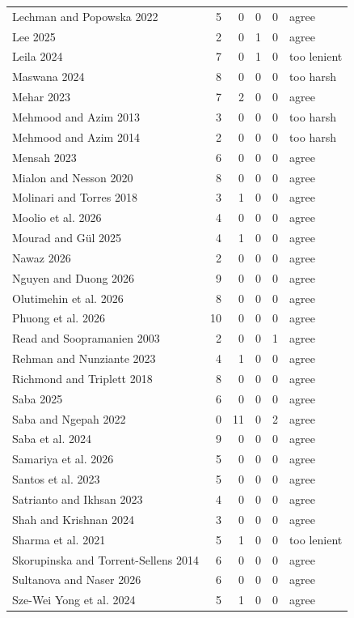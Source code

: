 {\begin{longtable}{@{}p{4cm} r r r r l@{}}
Lechman and Popowska 2022 & 5 & 0 & 0 & 0 & agree \\
Lee 2025 & 2 & 0 & 1 & 0 & agree \\
Leila 2024 & 7 & 0 & 1 & 0 & too lenient \\
Maswana 2024 & 8 & 0 & 0 & 0 & too harsh \\
Mehar 2023 & 7 & 2 & 0 & 0 & agree \\
Mehmood and Azim 2013 & 3 & 0 & 0 & 0 & too harsh \\
Mehmood and Azim 2014 & 2 & 0 & 0 & 0 & too harsh \\
Mensah 2023 & 6 & 0 & 0 & 0 & agree \\
Mialon and Nesson 2020 & 8 & 0 & 0 & 0 & agree \\
Molinari and Torres 2018 & 3 & 1 & 0 & 0 & agree \\
Moolio et al. 2026 & 4 & 0 & 0 & 0 & agree \\
Mourad and Gül 2025 & 4 & 1 & 0 & 0 & agree \\
Nawaz 2026 & 2 & 0 & 0 & 0 & agree \\
Nguyen and Duong 2026 & 9 & 0 & 0 & 0 & agree \\
Olutimehin et al. 2026 & 8 & 0 & 0 & 0 & agree \\
Phuong et al. 2026 & 10 & 0 & 0 & 0 & agree \\
Read and Soopramanien 2003 & 2 & 0 & 0 & 1 & agree \\
Rehman and Nunziante 2023 & 4 & 1 & 0 & 0 & agree \\
Richmond and Triplett 2018 & 8 & 0 & 0 & 0 & agree \\
Saba 2025 & 6 & 0 & 0 & 0 & agree \\
Saba and Ngepah 2022 & 0 & 11 & 0 & 2 & agree \\
Saba et al. 2024 & 9 & 0 & 0 & 0 & agree \\
Samariya et al. 2026 & 5 & 0 & 0 & 0 & agree \\
Santos et al. 2023 & 5 & 0 & 0 & 0 & agree \\
Satrianto and Ikhsan 2023 & 4 & 0 & 0 & 0 & agree \\
Shah and Krishnan 2024 & 3 & 0 & 0 & 0 & agree \\
Sharma et al. 2021 & 5 & 1 & 0 & 0 & too lenient \\
Skorupinska and Torrent-Sellens 2014 & 6 & 0 & 0 & 0 & agree \\
Sultanova and Naser 2026 & 6 & 0 & 0 & 0 & agree \\
Sze-Wei Yong et al. 2024 & 5 & 1 & 0 & 0 & agree \\

\end{longtable}}
